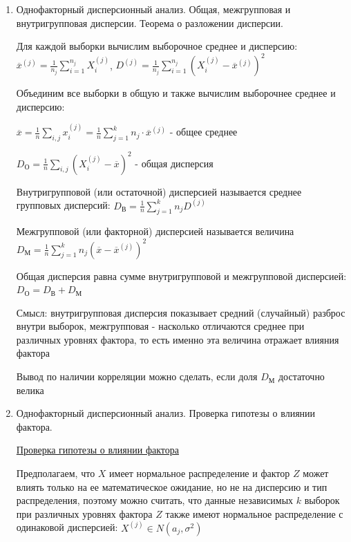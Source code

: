 \documentclass[12pt]{article}
\begin{document}
\begin{enumerate}
    \Nota Для работы критерия необходимо, что бы частота в каждой клетке была больше 5, а объем выборки был достаточно большой

    \item Однофакторный дисперсионный анализ. Общая, межгрупповая и внутригрупповая дисперсии. Теорема о разложении дисперсии.

    Для каждой выборки вычислим выборочное среднее и дисперсию: $\overline{x}^{(j)} = \frac{1}{n_j} \sum_{i = 1}^{n_j} X_i^{(j)}$, 
    $D^{(j)} = \frac{1}{n_j} \sum_{i = 1}^{n_j} (X_i^{(j)} - \overline{x}^{(j)})^2$

    Объединим все выборки в общую и также вычислим выборочнее среднее и дисперсию: 

    $\overline{x} = \frac{1}{n} \sum_{i, j} x^{(j)}_i = \frac{1}{n} \sum_{j = 1}^k n_j \cdot \overline{x}^{(j)}$ - общее среднее

    $D_\text{О} = \frac{1}{n} \sum_{i, j} (X^{(j)}_i - \overline{x})^2$ - общая дисперсия

    \Def Внутригрупповой (или остаточной) дисперсией называется среднее групповых дисперсий: $D_{\text{В}} = \frac{1}{n} \sum_{j = 1}^k n_j D^{(j)}$

    \Def Межгрупповой (или факторной) дисперсией называется величина $D_{\text{М}} = \frac{1}{n} \sum_{j = 1}^k n_j (\overline{x} - \overline{x}^{(j)})^2$

    \begin{MyTheorem}
         Общая дисперсия равна сумме внутригрупповой и межгрупповой дисперсией: $D_\text{О} = D_\text{В} + D_\text{М}$
    \end{MyTheorem}

    Смысл: внутригрупповая дисперсия показывает средний (случайный) разброс внутри выборок, межгрупповая - насколько отличаются среднее при различных 
    уровнях фактора, то есть именно эта величина отражает влияния фактора

    Вывод по наличии корреляции можно сделать, если доля $D_\text{М}$ достаточно велика

    \item Однофакторный дисперсионный анализ. Проверка гипотезы о влиянии фактора.

    \hyperlink{factor_influence_hypothesis}{Проверка гипотезы о влиянии фактора}
    
    Предполагаем, что $X$ имеет нормальное распределение и фактор $Z$ может влиять только на ее математическое ожидание, 
    но не на дисперсию и тип распределения, поэтому можно считать, что данные независимых $k$ выборок при различных уровнях фактора $Z$
    также имеют нормальное распределение с одинаковой дисперсией: $X^{(j)} \in N(a_j, \sigma^2)$


\end{enumerate}
\end{document}
